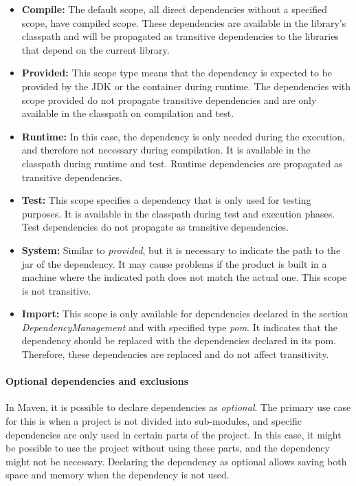 \begin{itemize}
  \item \textbf{Compile:} The default scope, all direct dependencies without a specified scope, have compiled scope. These dependencies are available in the library's classpath and will be propagated as transitive dependencies to the libraries that depend on the current library.

  \item \textbf{Provided:} This scope type means that the dependency is expected to be provided by the JDK or the container during runtime. The dependencies with scope provided do not propagate transitive dependencies and are only available in the classpath on compilation and test.

  \item \textbf{Runtime:} In this case, the dependency is only needed during the execution, and therefore not necessary during compilation. It is available in the classpath during runtime and test. Runtime dependencies are propagated as transitive dependencies.

  \item \textbf{Test:} This scope specifies a dependency that is only used for testing purposes. It is available in the classpath during test and execution phases. Test dependencies do not propagate as transitive dependencies.

  \item \textbf{System:} Similar to \textit{provided}, but it is necessary to indicate the path to the jar of the dependency. It may cause problems if the product is built in a machine where the indicated path does not match the actual one. This scope is not transitive.

  \item \textbf{Import:} This scope is only available for dependencies declared in the section \textit{DependencyManagement} and with specified type \textit{pom}. It indicates that the dependency should be replaced with the dependencies declared in its pom. Therefore, these dependencies are replaced and do not affect transitivity.
\end{itemize}

\paragraph{Optional dependencies and exclusions}
In Maven, it is possible to declare dependencies as \textit{optional}. The primary use case for this is when a project is not divided into sub-modules, and specific dependencies are only used in certain parts of the project. In this case, it might be possible to use the project without using these parts, and the dependency might not be necessary. Declaring the dependency as optional allows saving both space and memory when the dependency is not used.

